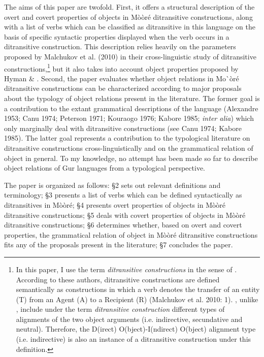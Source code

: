 \documentclass[output=paper]{langsci/langscibook}
\begin{document}
The aims of this paper are twofold. First, it offers a structural description of the overt and covert properties of objects in M\`{o}\`{o}r\'{e} ditransitive constructions, along with a list of verbs which can be classified as ditransitive in this language on the basis of specific syntactic properties displayed when the verb occurs in a ditransitive construction. This description relies heavily on the parameters proposed by Malchukov et al.\textit{ }(2010) in their cross-linguistic study of ditransitive constructions,\footnote{ In this paper, I use the term \textit{ditransitive constructions} in the sense of \citet{MalchukovEtAl2010}. According to these authors, ditransitive constructions are defined semantically as constructions in which a verb denotes the transfer of an entity (T) from an Agent (A) to a Recipient (R) (Malchukov et al. 2010: 1). \citet{MalchukovEtAl2010}, unlike \citet{Goldberg1995}, include under the term \textit{ditransitive construction} different types of alignments of the two object arguments (i.e. indirective, secundative and neutral). Therefore, the D(irect) O(bject)-I(ndirect) O(bject) alignment type (i.e. indirective) is also an instance of a ditransitive construction under this definition. } but it also takes into account object properties proposed by Hyman \& \citet{Duranti1982}.  Second, the paper evaluates whether object relations in Mo\`{ }\`{o}r\'{e} ditransitive constructions can be characterized according to major proposals about the typology of object relations present in the literature. The former goal is a contribution to the extant grammatical descriptions of the language (Alexandre 1953; Canu 1974; Peterson 1971; Kouraogo 1976; Kabore 1985; \textit{inter alia}) which only marginally deal with ditransitive constructions (see Canu 1974; Kabore 1985). The latter goal represents a contribution to the typological literature on ditransitive constructions cross-linguistically and on the grammatical relation of object in general. To my knowledge, no attempt has been made so far to describe object relations of Gur languages from a typological perspective.  

The paper is organized as follows: §2 sets out relevant definitions and terminology; §3 presents a list of verbs which can be defined syntactically as ditransitives in M\`{o}\`{o}r\'{e}; §4 presents overt properties of objects in M\`{o}\`{o}r\'{e} ditransitive constructions; §5 deals with covert properties of objects in M\`{o}\`{o}r\'{e} ditransitive constructions; §6 determines whether, based on overt and covert properties, the grammatical relation of object in M\`{o}\`{o}r\'{e} ditransitive constructions fits any of the proposals present in the literature; §7 concludes the paper.    
\end{document}
